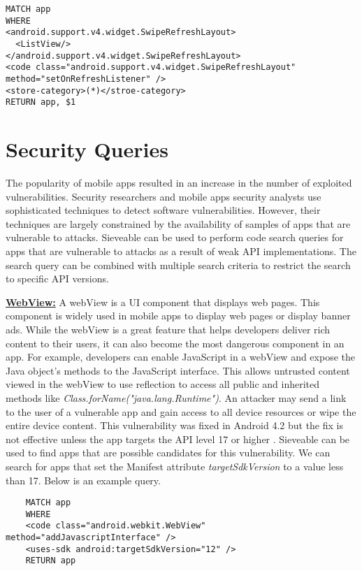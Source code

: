 \begin{verbatim}
MATCH app
WHERE
<android.support.v4.widget.SwipeRefreshLayout>
  <ListView/>
</android.support.v4.widget.SwipeRefreshLayout>
<code class="android.support.v4.widget.SwipeRefreshLayout" method="setOnRefreshListener" />
<store-category>(*)</stroe-category>
RETURN app, $1
\end{verbatim}

\section{Security Queries}
The popularity of mobile apps resulted in an increase in the number of exploited vulnerabilities.
Security researchers and mobile apps security analysts use sophisticated techniques to detect software vulnerabilities.
However, their techniques are largely constrained by the availability of samples of apps that are vulnerable to attacks.
Sieveable can be used to perform code search queries for apps that are vulnerable to attacks as a result of weak API implementations.
The search query can be combined with multiple search criteria to restrict the search to specific API versions.

\underline{\textbf{WebView:}}
A webView is a UI component that displays web pages. 
This component is widely used in mobile apps to display web pages or display banner ads.
While the webView is a great feature that helps developers deliver rich content to their users, it can also become the most dangerous component in an app.
For example, developers can enable JavaScript in a webView and expose the Java object's methods to the JavaScript interface.
This allows untrusted  content viewed in the webView to use reflection to access all public and inherited methods like \textit{Class.forName("java.lang.Runtime")}.
An attacker may send a link to the user of a vulnerable app and gain access to all device resources or wipe the entire device content. 
This vulnerability was fixed in Android 4.2 but the fix is not effective unless the app targets the API level 17 or higher \cite{WebViewVulnerability}.
Sieveable can be used to find apps that are possible candidates for this vulnerability.
We can search for apps that set the Manifest attribute \textit{targetSdkVersion} to a value less than 17.  Below is an example query.
\begin{verbatim}
	MATCH app
	WHERE
	<code class="android.webkit.WebView" method="addJavascriptInterface" />
	<uses-sdk android:targetSdkVersion="12" />
	RETURN app
\end{verbatim}

